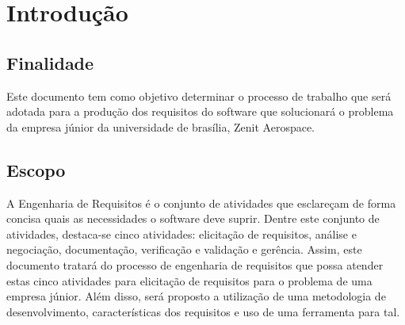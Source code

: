 \chapter[Introdução]{Introdução}

\section{Finalidade}
Este documento tem como objetivo determinar o processo de trabalho que será adotada para a produção dos requisitos do software que solucionará o problema da empresa júnior da universidade de brasília, Zenit Aerospace.
\section{Escopo}
A Engenharia de Requisitos é o conjunto de atividades que esclareçam de forma concisa quais as necessidades o software deve suprir. Dentre este conjunto de atividades, destaca-se cinco atividades: elicitação de requisitos, análise e negociação, documentação, verificação e validação e gerência. Assim, este documento tratará do processo de engenharia de requisitos que possa atender estas cinco atividades para elicitação de requisitos para o problema de uma empresa júnior. Além disso, será proposto a utilização de uma metodologia de desenvolvimento, características dos requisitos e uso de uma ferramenta para tal.

